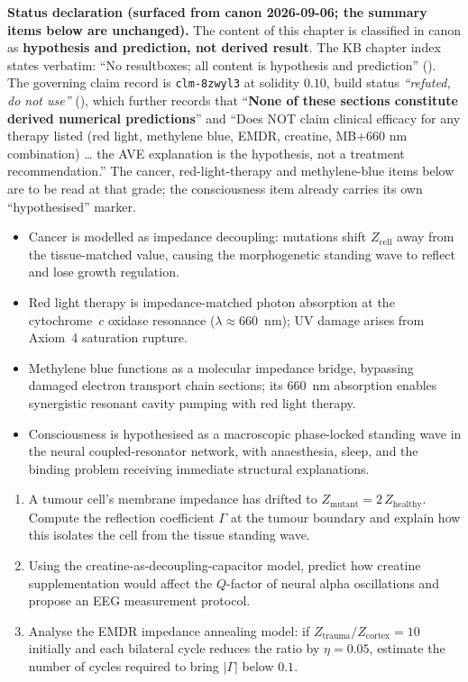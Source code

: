 \begin{summarybox}
\noindent\textbf{Status declaration (surfaced from canon 2026-09-06; the summary items below are unchanged).} The content of this chapter is classified in canon as \textbf{hypothesis and prediction, not derived result}. The KB chapter index states verbatim: ``No resultboxes; all content is hypothesis and prediction'' (). The governing claim record is \texttt{clm-8zwyl3} at solidity $0.10$, build status \emph{``refuted, do not use''} (), which further records that ``\textbf{None of these sections constitute derived numerical predictions}'' and ``Does NOT claim clinical efficacy for any therapy listed (red light, methylene blue, EMDR, creatine, MB+660 nm combination) \ldots{} the AVE explanation is the hypothesis, not a treatment recommendation.'' The cancer, red-light-therapy and methylene-blue items below are to be read at that grade; the consciousness item already carries its own ``hypothesised'' marker.

\begin{itemize}
    \item Cancer is modelled as impedance decoupling: mutations shift $Z_{\text{cell}}$ away from the tissue-matched value, causing the morphogenetic standing wave to reflect and lose growth regulation.
    \item Red light therapy is impedance-matched photon absorption at the cytochrome~$c$ oxidase resonance ($\lambda \approx 660$~nm); UV damage arises from Axiom~4 saturation rupture.
    \item Methylene blue functions as a molecular impedance bridge, bypassing damaged electron transport chain sections; its 660~nm absorption enables synergistic resonant cavity pumping with red light therapy.
    \item Consciousness is hypothesised as a macroscopic phase-locked standing wave in the neural coupled-resonator network, with anaesthesia, sleep, and the binding problem receiving immediate structural explanations.
\end{itemize}
\end{summarybox}

\begin{exercisebox}
\begin{enumerate}
    \item A tumour cell's membrane impedance has drifted to $Z_{\text{mutant}} = 2\,Z_{\text{healthy}}$. Compute the reflection coefficient $\Gamma$ at the tumour boundary and explain how this isolates the cell from the tissue standing wave.
    \item Using the creatine-as-decoupling-capacitor model, predict how creatine supplementation would affect the $Q$-factor of neural alpha oscillations and propose an EEG measurement protocol.
    \item Analyse the EMDR impedance annealing model: if $Z_{\text{trauma}}/Z_{\text{cortex}} = 10$ initially and each bilateral cycle reduces the ratio by $\eta = 0.05$, estimate the number of cycles required to bring $|\Gamma|$ below $0.1$.
\end{enumerate}
\end{exercisebox}

